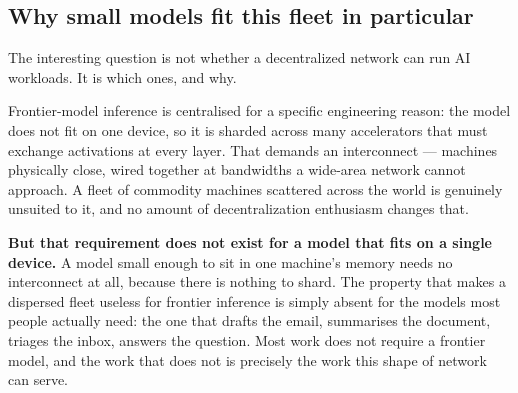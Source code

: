 \subsection{Why small models fit this fleet in particular}

The interesting question is not whether a decentralized network can run AI workloads. It is which
ones, and why.

Frontier-model inference is centralised for a specific engineering reason: the model does not fit on
one device, so it is sharded across many accelerators that must exchange activations at every layer.
That demands an interconnect --- machines physically close, wired together at bandwidths a wide-area
network cannot approach. A fleet of commodity machines scattered across the world is genuinely
unsuited to it, and no amount of decentralization enthusiasm changes that.

\textbf{But that requirement does not exist for a model that fits on a single device.} A model small
enough to sit in one machine's memory needs no interconnect at all, because there is nothing to
shard. The property that makes a dispersed fleet useless for frontier inference is simply absent for
the models most people actually need: the one that drafts the email, summarises the document,
triages the inbox, answers the question. Most work does not require a frontier model, and the work
that does not is precisely the work this shape of network can serve.


